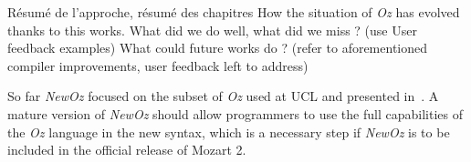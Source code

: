 
Résumé de l'approche, résumé des chapitres
How the situation of \textit{Oz} has evolved thanks to this works.\newline
What did we do well, what did we miss ? (use User feedback examples)\newline
What could future works do ? (refer to aforementioned compiler improvements, user feedback left to address)\newline

So far \textit{NewOz} focused on the subset of \textit{Oz} used at UCL and presented in~\cite{van2004concepts}.
A mature version of \textit{NewOz} should allow programmers to use the full capabilities of the \textit{Oz} language in the new syntax, which is a necessary step if \textit{NewOz} is to be included in the official release of Mozart 2.